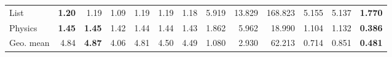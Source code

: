 \begin{tabular}{l rrrrrr|rrrrrr}
List & \cellcolor{estitchHighlight!9}\textbf{1.20} & \cellcolor{estitchHighlight!9}1.19 & \cellcolor{ecorange!9}1.09 & \cellcolor{estitchHighlight!9}1.19 & \cellcolor{estitchHighlight!9}1.19 & \cellcolor{ecblue!9}1.18 & \cellcolor{estitchHighlight!9}5.919 & \cellcolor{estitchHighlight!9}13.829 & \cellcolor{ecorange!9}168.823 & \cellcolor{estitchHighlight!9}5.155 & \cellcolor{estitchHighlight!9}5.137 & \cellcolor{ecblue!9}\textbf{1.770} \\
Physics & \cellcolor{estitchHighlight!9}\textbf{1.45} & \cellcolor{estitchHighlight!9}\textbf{1.45} & \cellcolor{ecorange!9}1.42 & \cellcolor{estitchHighlight!9}1.44 & \cellcolor{estitchHighlight!9}1.44 & \cellcolor{ecblue!9}1.43 & \cellcolor{estitchHighlight!9}1.862 & \cellcolor{estitchHighlight!9}5.962 & \cellcolor{ecorange!9}18.990 & \cellcolor{estitchHighlight!9}1.104 & \cellcolor{estitchHighlight!9}1.132 & \cellcolor{ecblue!9}\textbf{0.386} \\
\midrule
Geo. mean & \cellcolor{estitchHighlight!9}4.84 & \cellcolor{estitchHighlight!9}\textbf{4.87} & \cellcolor{ecorange!9}4.06 & \cellcolor{estitchHighlight!9}4.81 & \cellcolor{estitchHighlight!9}4.50 & \cellcolor{ecblue!9}4.49 & \cellcolor{estitchHighlight!9}1.080 & \cellcolor{estitchHighlight!9}2.930 & \cellcolor{ecorange!9}62.213 & \cellcolor{estitchHighlight!9}0.714 & \cellcolor{estitchHighlight!9}0.851 & \cellcolor{ecblue!9}\textbf{0.481} \\
\bottomrule
\end{tabular}
